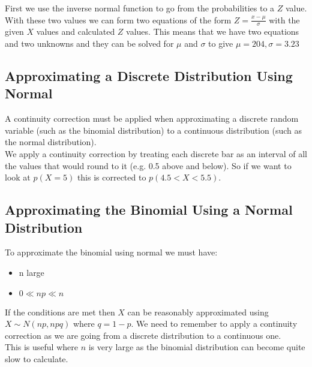 \documentclass[class=article, crop=false]{standalone}
\begin{document}
First we use the inverse normal function to go from the probabilities to a $Z$ value. With these two values we can form two equations of the form $Z = \frac{x - \mu}{\sigma}$ with the given $X$ values and calculated $Z$ values. This means that we have two equations and two unknowns and they can be solved for $\mu$ and $\sigma$ to give $\mu = 204, \sigma = 3.23$ \\
\subsection*{Approximating a Discrete Distribution Using Normal}
A continuity correction must be applied when approximating a discrete random variable (such as the binomial distribution) to a continuous distribution (such as the normal distribution). \\

We apply a continuity correction by treating each discrete bar as an interval of all the values that would round to it (e.g. 0.5 above and below). So if we want to look at $p(X=5)$ this is corrected to $p(4.5 < X < 5.5)$. 

\subsection*{Approximating the Binomial Using a Normal Distribution}
To approximate the binomial using normal we must have:
\begin{itemize}
	\item n large
	\item $0 \ll np \ll n$
\end{itemize}
If the conditions are met then $X$ can be reasonably approximated using  $X \sim N(np, npq)$ where $q = 1-p$. We need to remember to apply a continuity correction as we are going from a discrete distribution to a continuous one. \\

This is useful where $n$ is very large as the binomial distribution can become quite slow to calculate. \\
\end{document}
